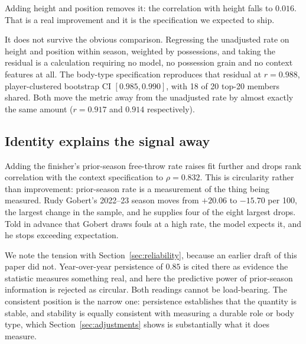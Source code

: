 \documentclass[11pt,a4paper]{article}
\begin{document}
Adding height and position removes it: the correlation with height falls to
$0.016$. That is a real improvement and it is the specification we expected to
ship.

It does not survive the obvious comparison. Regressing the unadjusted rate on
height and position within season, weighted by possessions, and taking the
residual is a calculation requiring no model, no possession grain and no context
features at all. The body-type specification reproduces that residual at
$r = 0.988$, player-clustered bootstrap CI $[0.985, 0.990]$, with 18 of 20
top-20 members shared. Both move the metric away from the unadjusted rate by
almost exactly the same amount ($r = 0.917$ and $0.914$ respectively).

\subsection{Identity explains the signal away}

Adding the finisher's prior-season free-throw rate raises fit further and drops
rank correlation with the context specification to $\rho = 0.832$. This is
circularity rather than improvement: prior-season rate is a measurement of the
thing being measured. Rudy Gobert's 2022--23 season moves from $+20.06$ to
$-15.70$ per 100, the largest change in the sample, and he supplies four of the
eight largest drops. Told in advance that Gobert draws fouls at a high rate, the
model expects it, and he stops exceeding expectation.

We note the tension with Section~\ref{sec:reliability}, because an earlier draft
of this paper did not. Year-over-year persistence of $0.85$ is cited there as
evidence the statistic measures something real, and here the predictive power of
prior-season information is rejected as circular. Both readings cannot be
load-bearing. The consistent position is the narrow one: persistence establishes
that the quantity is stable, and stability is equally consistent with measuring a
durable role or body type, which Section~\ref{sec:adjustments} shows is
substantially what it does measure.
\end{document}
